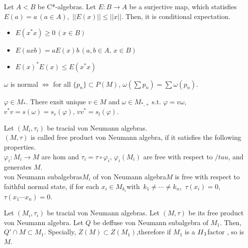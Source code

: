 \begin{theorem}
  Let $A < B$ be C*-algebras. 
  Let $E:B \rightarrow A$ be a surjective map, which statisfies $E(a)=a \,(a \in A)$,\, $||E(x)|| \leq ||x||$.
  Then, it is conditional expectation. 
\begin{itemize}
\item $E(x^{*}x) \geq 0 \,(x \in B)$
\item $E(axb)=aE(x)b\,(a,b \in A,\, x \in B)$
\item ${E(x)^{*}E(x)} \leq E(x^{*}x)$
\end{itemize}
\end{theorem}

\begin{theorem}
  $\omega$ is normal $\Leftrightarrow$ for all $\{ p_n \} \subset P(M)$, $\omega(\sum p_n) = \sum \omega (p_n)$.
\end{theorem}
  
\begin{theorem}
  $\varphi \in M_{*}$. There exsit unique $v \in M$ and $\omega \in M_{*,+}$ s.t. $\varphi = v \omega$, $v^{*}v = s(\omega) = s_r(\varphi)$, $vv^{*} = s_l(\varphi)$.
\end{theorem}




\begin{definition}
Let $(M_i , {\tau}_i)$ be tracial von Neumann algebras. \\
$(M,\tau)$ is called free product von Neumann algebra, if it satisfies the following properties. \\
${\varphi}_i : M_i \rightarrow M$ are hom and ${\tau}_i = {\tau} \circ {\varphi}_i$, 
${\varphi}_i (M_i)$ are free with respect to $/tau$, and generates $M$. \\
von Neumann subalgebras$M_i$ of von Neumann algebra$M$ is free with respect to faithful normal state,
if for each $x_i \in M_{k_i}$with\, $k_1 \neq \cdots  \neq k_n$,\, $\tau (x_i) = 0$, $\tau (x_1 \cdots x_n) = 0$.
\end{definition}



\begin{theorem}
Let $(M_i , {\tau}_i)$ be tracial von Neumann algebras. 
Let $(M,\tau)$ be its free product von Neumann algebra. 
Let $Q$ be deffuse von Neumann subalgebra of $M_1$. 
Then, $Q' \cap M \subset M_1$. 
Specially, $Z(M) \subset Z(M_1)$,therefore if  $M_1$ is a ${I\hspace{-.1em}I}_1$factor , so is $M$. 
\end{theorem}

